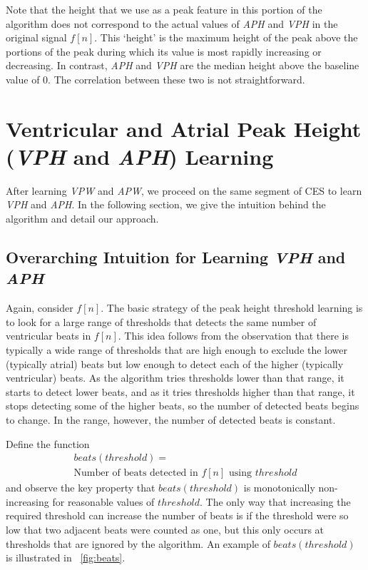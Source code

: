 \documentclass[conference]{IEEEtran}
\newcommand{\APW}{\textit{APW}}
\newcommand{\VPW}{\textit{VPW}}
\newcommand{\APH}{\textit{APH}}
\newcommand{\VPH}{\textit{VPH}}
\begin{document}
Note that the height that we use as a peak feature in
this portion of the algorithm does not correspond to the
actual values of \APH{} and \VPH{} in the original signal
$f[n]$. This `height' is the maximum height of the peak
above the portions of the peak during which its
value is most rapidly increasing or decreasing. 
In contrast, \APH{} and \VPH{} are the median height above the baseline value of 0.
The correlation between these two is not straightforward. 

\section{Ventricular and Atrial Peak Height (\VPH{} and \APH{}) Learning}
After learning \VPW{} and \APW{}, we proceed on the
same segment of CES to learn \VPH{} and \APH{}. In
the following section, we give the intuition behind the
algorithm and detail our approach.

\subsection{Overarching Intuition for Learning \VPH{} and \APH{}}
Again, consider $f[n]$. The basic strategy of the peak
height threshold learning is to look for a large range of
thresholds that detects the same number of ventricular beats in
$f[n]$. This idea follows from the observation that there
is typically a wide range of thresholds that are high
enough to exclude the lower (typically atrial) beats but
low enough to detect each of the higher (typically
ventricular) beats. As the algorithm tries thresholds
lower than that range, it starts to detect lower beats, and
as it tries thresholds higher than that range, it stops
detecting some of the higher beats, so the number of
detected beats begins to change. In the range, however,
the number of detected beats is constant.

Define the function 
\begin{multline*}
	beats(threshold) = \\\text{Number of beats detected in } f[n] \text{ using } threshold
\end{multline*}
and observe the key property that $beats(threshold)$ is monotonically non-increasing for reasonable values of $threshold$. 
The only way that increasing the required threshold can increase the number of beats is if the threshold were so low that two adjacent beats were counted as one, but this only occurs at thresholds that are ignored by the algorithm.
An example of $beats(threshold)$ is illustrated in \figurename~\ref{fig:beats}.
\end{document}
